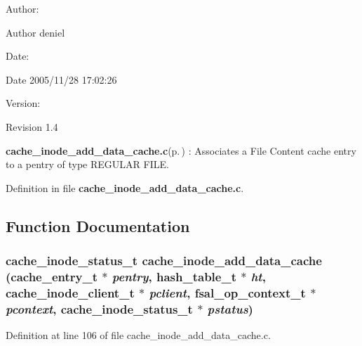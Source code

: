 \begin{Desc}
\item[Author:]\begin{Desc}
\item[Author]deniel \end{Desc}
\end{Desc}
\begin{Desc}
\item[Date:]\begin{Desc}
\item[Date]2005/11/28 17:02:26 \end{Desc}
\end{Desc}
\begin{Desc}
\item[Version:]\begin{Desc}
\item[Revision]1.4 \end{Desc}
\end{Desc}
{\bf cache\_\-inode\_\-add\_\-data\_\-cache.c}{\rm (p.\,\pageref{cache__inode__add__data__cache_8c})} : Associates a File Content cache entry to a pentry of type REGULAR FILE.

Definition in file {\bf cache\_\-inode\_\-add\_\-data\_\-cache.c}.

\subsection{Function Documentation}
\subsubsection{\setlength{\rightskip}{0pt plus 5cm}cache\_\-inode\_\-status\_\-t cache\_\-inode\_\-add\_\-data\_\-cache (cache\_\-entry\_\-t $\ast$ {\em pentry}, hash\_\-table\_\-t $\ast$ {\em ht}, cache\_\-inode\_\-client\_\-t $\ast$ {\em pclient}, fsal\_\-op\_\-context\_\-t $\ast$ {\em pcontext}, cache\_\-inode\_\-status\_\-t $\ast$ {\em pstatus})}\label{cache__inode__add__data__cache_8c_a0}




Definition at line 106 of file cache\_\-inode\_\-add\_\-data\_\-cache.c.